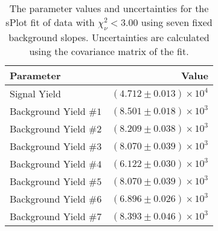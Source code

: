 
\begin{table}[ht]
    \begin{center}
        \begin{tabular}{lr}\toprule
            Parameter & Value \\\midrule
            Signal Yield & $(4.712 \pm 0.013) \times 10^{4}$ \\
            Background Yield $\#1$ & $(8.501 \pm 0.018) \times 10^{3}$ \\
            Background Yield $\#2$ & $(8.209 \pm 0.038) \times 10^{3}$ \\
            Background Yield $\#3$ & $(8.070 \pm 0.039) \times 10^{3}$ \\
            Background Yield $\#4$ & $(6.122 \pm 0.030) \times 10^{3}$ \\
            Background Yield $\#5$ & $(8.070 \pm 0.039) \times 10^{3}$ \\
            Background Yield $\#6$ & $(6.896 \pm 0.026) \times 10^{3}$ \\
            Background Yield $\#7$ & $(8.393 \pm 0.046) \times 10^{3}$ \\\bottomrule
        \end{tabular}
        \caption{The parameter values and uncertainties for the sPlot fit of data with $\chi^2_\nu < 3.00$ using seven fixed background slopes. Uncertainties are calculated using the covariance matrix of the fit.}\label{tab:splot-fit-results-chisqdof-3.00-fixed-7}
    \end{center}
\end{table}
